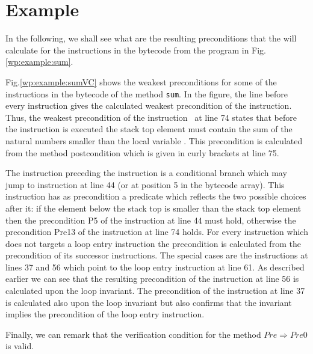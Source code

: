 \section{Example}\label{wp:example}
In the following, we  shall see what are the resulting preconditions 
that the \fwpi{} will calculate for the instructions in the bytecode from the program in Fig. \ref{wp:example:sum}.



Fig.\ref{wp:example:sumVC} shows the weakest preconditions for some of the instructions in the bytecode of the method  \lstinline!sum!.
In the figure, the line before every instruction gives the calculated weakest precondition of the instruction.
 Thus, the weakest precondition of the instruction  \return \ at line 74 states that before the instruction is executed the stack top element
\stack{\counter}  must  contain the sum  of the natural numbers smaller than the local variable . This precondition is calculated from the method postcondition 
which is given in curly brackets at line 75.



The instruction preceding the \return{}
instruction is a conditional branch which may jump to instruction at line 44 (or at position 5 in the bytecode array). 
This instruction has as precondition a predicate which reflects the two possible choices after it: if the element below
the stack top  is smaller than the stack top element \stack{\counter} then the precondition P5 of
the instruction at line 44 must hold, otherwise the precondition Pre13 of the instruction at line 74 holds. 
For every instruction which does not targets a loop entry instruction the precondition is calculated from the precondition of its
 successor instructions. The special cases are the instructions at lines 37 and 56 which point to the loop entry instruction
 at line 61. As described earlier we can see that the resulting precondition of the instruction at line 56 is calculated upon the loop invariant.
The precondition of the instruction at line 37 is calculated also upon the loop invariant but also confirms that the invariant implies
the precondition of the loop entry instruction.

Finally, we can remark that the  verification condition for the method $Pre \Rightarrow  Pre0$ is valid.






